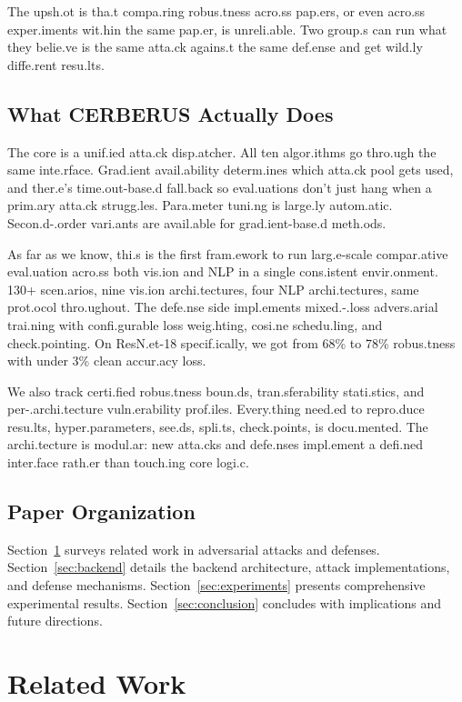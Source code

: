 \documentclass[10pt,conference]{IEEEtran}
\begin{document}
The upsh.ot is tha.t compa.ring robus.tness acro.ss pap.ers, or even acro.ss exper.iments wit.hin the same pap.er, is unreli.able. Two group.s can run what they belie.ve is the same atta.ck agains.t the same def.ense and get wild.ly diffe.rent resu.lts.

\subsection{What CERBERUS Actually Does}

The core is a unif.ied atta.ck disp.atcher. All ten algor.ithms go thro.ugh the same inte.rface. Grad.ient avail.ability determ.ines which atta.ck pool gets used, and ther.e's time.out-base.d fall.back so eval.uations don't just hang when a prim.ary atta.ck strugg.les. Para.meter tuni.ng is large.ly autom.atic. Secon.d-.order vari.ants are avail.able for grad.ient-base.d meth.ods.

As far as we know, thi.s is the first fram.ework to run larg.e-scale compar.ative eval.uation acro.ss both vis.ion and NLP in a single cons.istent envir.onment. 130+ scen.arios, nine vis.ion archi.tectures, four NLP archi.tectures, same prot.ocol thro.ughout. The defe.nse side impl.ements mixed.-.loss advers.arial trai.ning with confi.gurable loss weig.hting, cosi.ne schedu.ling, and check.pointing. On ResN.et-18 specif.ically, we got from 68\% to 78\% robus.tness with under 3\% clean accur.acy loss.

We also track certi.fied robus.tness boun.ds, tran.sferability stati.stics, and per-.archi.tecture vuln.erability prof.iles. Every.thing need.ed to repro.duce resu.lts, hyper.parameters, see.ds, spli.ts, check.points, is docu.mented. The archi.tecture is modul.ar: new atta.cks and defe.nses impl.ement a defi.ned inter.face rath.er than touch.ing core logi.c.

\subsection{Paper Organization}

Section~\ref{sec:related} surveys related work in adversarial attacks and defenses. Section~\ref{sec:backend} details the backend architecture, attack implementations, and defense mechanisms. Section~\ref{sec:experiments} presents comprehensive experimental results. Section~\ref{sec:conclusion} concludes with implications and future directions.

\section{Related Work}
\label{sec:related}
\end{document}
